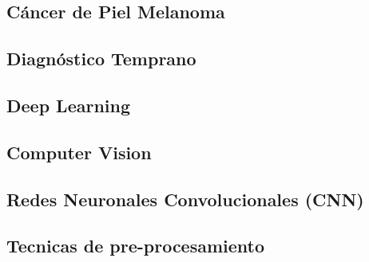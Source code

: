 \subsection{Cáncer de Piel Melanoma}


\subsection{Diagnóstico Temprano}

 
\subsection{Deep Learning}

\subsection{Computer Vision}

\subsection{Redes Neuronales Convolucionales (CNN)}

\subsection{Tecnicas de pre-procesamiento}

